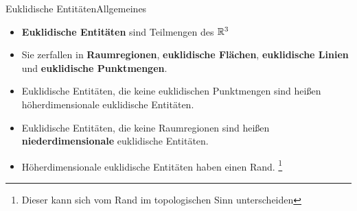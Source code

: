 \documentclass[10pt,xcolor={dvipsnames}]{beamer}
\begin{document}


\begin{frame}{Euklidische Entitäten}{Allgemeines}
  \begin{itemize}
    \item %
        \textbf{Euklidische Entitäten} sind Teilmengen des $\mathbb{R}^3$
    \item %
        Sie zerfallen in \textbf{Raumregionen}, \textbf{euklidische Flächen}, \textbf{euklidische Linien} und \textbf{euklidische Punktmengen}.
    \item %
        Euklidische Entitäten, die keine euklidischen Punktmengen sind heißen höherdimensionale euklidische Entitäten.
    \item %
        Euklidische Entitäten, die keine Raumregionen sind heißen \textbf{niederdimensionale} euklidische Entitäten.
    \item %
        Höherdimensionale euklidische Entitäten haben einen Rand.%
        \footnote{
            Dieser kann sich vom Rand im topologischen Sinn unterscheiden
        }
  \end{itemize}
\end{frame}
\end{document}
